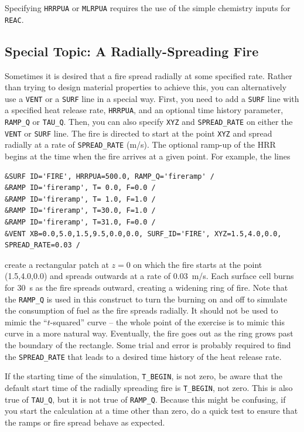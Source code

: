 \documentclass[11pt]{book}
\newcommand{\ct}{\tt\small}
\begin{document}
\begin{warning}
Specifying {\ct HRRPUA} or {\ct MLRPUA} requires the use of the simple chemistry inputs for {\ct REAC}.
\end{warning}



\subsection{Special Topic: A Radially-Spreading Fire}
\label{info:spread}

Sometimes it is desired that a fire spread radially at some specified
rate. Rather than trying to design material properties
to achieve this, you can alternatively use a {\ct VENT} or a {\ct SURF} line in a special way.
First, you need to add a {\ct SURF} line with
a specified heat release rate, {\ct HRRPUA}, and an optional
time history parameter, {\ct RAMP\_Q} or {\ct TAU\_Q}. Then, you can also specify {\ct XYZ} and {\ct SPREAD\_RATE} on either the {\ct VENT} or {\ct SURF} line.
The fire is directed to start at the point {\ct XYZ} and spread
radially at a rate of {\ct SPREAD\_RATE} (m/s). The optional ramp-up of the HRR begins at
the time when the fire arrives at a given point.
For example, the lines

\footnotesize
\begin{verbatim}
&SURF ID='FIRE', HRRPUA=500.0, RAMP_Q='fireramp' /
&RAMP ID='fireramp', T= 0.0, F=0.0 /
&RAMP ID='fireramp', T= 1.0, F=1.0 /
&RAMP ID='fireramp', T=30.0, F=1.0 /
&RAMP ID='fireramp', T=31.0, F=0.0 /
&VENT XB=0.0,5.0,1.5,9.5,0.0,0.0, SURF_ID='FIRE', XYZ=1.5,4.0,0.0, SPREAD_RATE=0.03 /
\end{verbatim}
\normalsize

\noindent
create a rectangular patch at $z=0$ on which the fire starts at the
point (1.5,4.0,0.0) and spreads outwards at a rate of 0.03~m/s. Each surface cell
burns for 30~s as the fire spreads outward, creating a widening ring of fire. Note that the {\ct RAMP\_Q} is used in this
construct to turn the burning on and off to simulate the consumption of fuel as the fire spreads radially. It should not
be used to mimic the ``$t$-squared'' curve -- the whole point of the exercise is to mimic this curve in a more natural way.
Eventually, the fire goes out as the ring grows past the boundary of the rectangle.
Some trial and error is probably required to find the {\ct SPREAD\_RATE} that
leads to a desired time history of the heat release rate.

\begin{warning}
If the starting time of the simulation, {\ct T\_BEGIN}, is not zero, be aware that the default start time of the radially spreading
fire is {\ct T\_BEGIN}, not zero. This is also true of {\ct TAU\_Q}, but it is not true of {\ct RAMP\_Q}. Because this might be
confusing, if you start the calculation at a time other than zero, do a quick test to ensure that the ramps or fire spread behave as
expected.
\end{warning}
\end{document}
